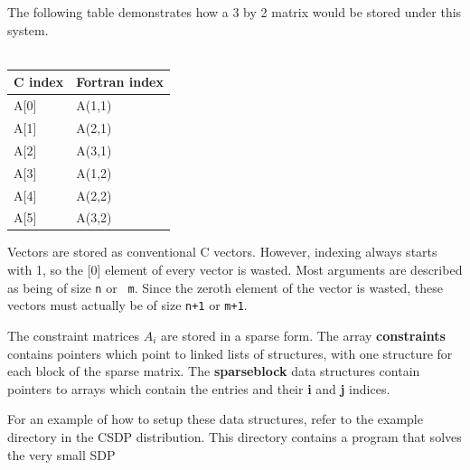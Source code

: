 \documentclass{article}
\begin{document}
The following table  demonstrates how a 3 by 2 matrix would
be stored under this system.  
\\
\\
\begin{tabular}{|l|l|} \hline
C index & Fortran index \\ \hline
A[0] & A(1,1) \\ \hline
A[1] & A(2,1) \\ \hline
A[2] & A(3,1) \\ \hline
A[3] & A(1,2) \\ \hline
A[4] & A(2,2) \\ \hline
A[5] & A(3,2) \\ \hline
\end{tabular}

Vectors are stored as conventional C vectors.  However, indexing
always starts with 1, so the [0] element of every vector is wasted.
Most arguments are described as being of size {\tt n} or {\tt
m}.  Since the zeroth element of the vector is wasted, these
vectors must actually be of size {\tt n+1} or {\tt m+1}.

The constraint matrices $A_{i}$ are stored in a sparse form.  The array
{\bf constraints} contains pointers which point to linked lists of
structures, with one structure for each block of the sparse matrix.
The {\bf sparseblock} data structures contain pointers to arrays which
contain the entries and their {\bf i} and {\bf j} indices.

For an example of how to setup these data structures, refer to the 
example directory in the CSDP distribution. 
This directory contains a program that solves the very
small SDP
\end{document}
